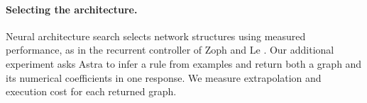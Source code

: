 \paragraph{Selecting the architecture.}
Neural architecture search selects network structures using measured performance, as in the recurrent controller of Zoph and Le \cite{zoph2017nas}. Our additional experiment asks Astra to infer a rule from examples and return both a graph and its numerical coefficients in one response. We measure extrapolation and execution cost for each returned graph.

